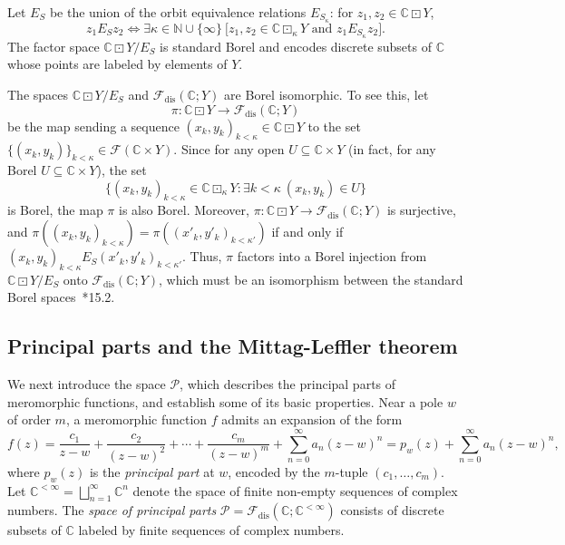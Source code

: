 \documentclass[12pt]{paper}
\numberwithin{equation}{section}
\theoremstyle{plain}
\theoremstyle{definition}
\newcommand{\C}{\mathbb{C}}
\newcommand{\N}{\mathbb{N}}
\newcommand{\effros}[1]{\mathcal{F}(#1)}
\newcommand{\effrosdis}[1]{\mathcal{F}_{\textrm{dis}}(#1)}
\newcommand{\ppart}{\mathcal{P}}
\DeclareMathOperator{\lprod}{\boxdot}
\begin{document}
Let \(E_{S}\) be the union of the orbit equivalence relations \(E_{S_{\kappa}}\): for
\(z_{1}, z_{2} \in \C \lprod Y\),
\[z_{1} E_{S} z_{2} \iff \exists \kappa \in \N \cup \{\infty\}\ \bigl[ z_{1},z_{2} \in \C
  \lprod_{\kappa} Y \textrm{ and } z_{1} E_{S_{\kappa}} z_{2} \bigr].\]
The factor space \(\C \lprod Y/E_{S}\) is standard Borel and encodes discrete subsets of \(\C\)
whose points are labeled by elements of \(Y\).

The spaces \(\C \lprod Y/E_{S}\) and \(\effrosdis{\C;Y}\) are Borel isomorphic.  To see this, let
\[
\pi : \C \lprod Y \to \effrosdis{\C;Y}
\]
be the map sending a sequence \((x_{k},y_{k})_{k < \kappa} \in \C \lprod Y\) to the set
\(\{(x_{k},y_{k})\}_{k < \kappa} \in \effros{\C \times Y}\).  Since for any open
\(U \subseteq \C \times Y\) (in fact, for any Borel \(U \subseteq \C \times Y\)), the set
\[\{(x_{k},y_{k})_{k < \kappa} \in \C \lprod_{\kappa} Y : \exists k < \kappa\ (x_{k},y_{k}) \in
  U\}\]
is Borel, the map \(\pi\) is also Borel.  Moreover, \(\pi : \C \lprod Y \to \effrosdis{\C;Y}\) is
surjective, and \(\pi((x_{k},y_{k})_{k < \kappa}) = \pi((x'_{k}, y'_{k})_{k < \kappa'})\) if and
only if \((x_{k},y_{k})_{k < \kappa}E_{S} (x'_{k},y'_{k})_{k < \kappa'}\).  Thus, \(\pi\) factors
into a Borel injection from \(\C \lprod Y/E_{S}\) onto \(\effrosdis{\C;Y}\), which must be an
isomorphism between the standard Borel spaces~\cite{Kechris}*{15.2}.


\subsection{Principal parts and the Mittag-Leffler theorem}
\label{sec:mitt-leffl}

We next introduce the space \(\ppart \), which describes the principal parts of meromorphic
functions, and establish some of its basic properties.  Near a pole \(w\) of order \(m\), a
meromorphic function \(f\) admits an expansion of the form
\[f(z) = \frac{c_{1}}{z-w} + \frac{c_{2}}{(z-w)^{2}} + \cdots + \frac{c_{m}}{(z-w)^{m}} +
  \sum_{n=0}^{\infty}a_{n}(z-w)^{n} = p_{w}(z) + \sum_{n=0}^{\infty}a_{n}(z-w)^{n},\]
where \(p_{w}(z)\) is the \emph{principal part} at \(w\), encoded by the \(m\)-tuple
\((c_{1}, \ldots, c_{m})\).  Let \( \C^{<\infty} = \bigsqcup_{n = 1}^{\infty} \C^{n}\) denote the
space of finite non-empty sequences of complex numbers.  The \emph{space of principal parts}
\(\ppart = \effrosdis{\C; \C^{<\infty}}\) consists of discrete subsets of \(\C\) labeled by finite
sequences of complex numbers.
\end{document}

